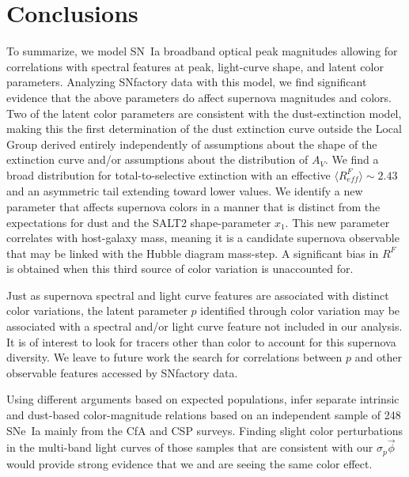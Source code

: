 \documentclass[trackchanges]{aastex62}   	%
\begin{document}
\section{Conclusions}
\label{conclusions:sec}
To summarize, we model SN~Ia broadband optical peak magnitudes allowing for correlations with spectral features at peak,
light-curve shape, and
latent color parameters.  Analyzing SNfactory data with this model, we find significant evidence that the above parameters do
affect supernova magnitudes and colors.  Two of the latent color parameters are consistent with the
 dust-extinction model, making this
the first determination of the dust extinction curve outside the Local Group
derived entirely independently of assumptions about the shape of the extinction curve and/or assumptions about the
distribution of $A_V$.  
We find a broad distribution for total-to-selective extinction
with an effective
$\langle R^F_{\mathit{eff}}\rangle \sim 2.43$ and an asymmetric tail extending toward lower values.
We identify a new
parameter that affects supernova
colors in a manner that is distinct from the expectations for dust
and the SALT2 shape-parameter $x_1$.
This new parameter correlates with host-galaxy mass, meaning it is a candidate supernova observable that may be linked
with the Hubble diagram mass-step.
A significant bias in $R^F$ is obtained when this third source of color variation
is unaccounted for.

Just as supernova spectral and light curve features are associated with distinct color variations, the latent parameter $p$
identified through color variation may be associated with a spectral and/or light curve feature not included
in our analysis.  It
is of interest to look for tracers other than color to account for this supernova diversity.
We leave to future work the search for correlations between $p$ and other
observable features accessed by SNfactory data.

Using different arguments based on expected populations,  infer
separate intrinsic and dust-based color-magnitude relations based on an independent sample of 248 SNe~Ia
mainly from the CfA \citep{1999AJ....117..707R, 2006AJ....131..527J, 2009ApJ...700.1097H, 2012ApJS..200...12H}
and CSP \citep{2010AJ....139..519C, 2011AJ....142..156S} surveys.
Finding slight color perturbations in the multi-band light curves 
of those samples that are  consistent with our $\sigma_p \vec{\phi}$ would provide strong evidence 
that we and    are seeing the same color effect.
\end{document}
